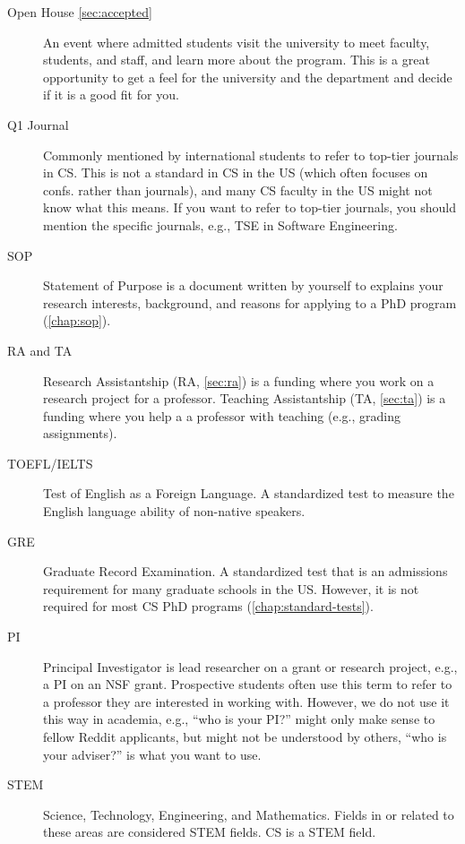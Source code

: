 \documentclass[oneside,11pt,dvipsnames]{book}
\begin{document}
\begin{description}
  \item[Open House \autoref{sec:accepted}] An event where admitted students visit the university to meet faculty, students, and staff, and learn more about the program. This is a great opportunity to get a feel for the university and the department and decide if it is a good fit for you.
  
  \item[Q1 Journal] Commonly mentioned by international students to refer to top-tier journals in CS.  This is not a standard in CS in the US (which often focuses on confs. rather than journals), and many CS faculty in the US might not know what this means.  If you want to refer to top-tier journals, you should mention the specific journals, e.g., TSE in Software Engineering.
  
  \item[SOP] Statement of Purpose is a document written by yourself to explains your research interests, background, and reasons for applying to a PhD program (\autoref{chap:sop}).

  \item[RA and TA] Research Assistantship (RA, \autoref{sec:ra}) is a funding where you work on a research project for a professor. Teaching Assistantship (TA, \autoref{sec:ta}) is a funding where you help a a professor with teaching (e.g., grading assignments).

  \item[TOEFL/IELTS] Test of English as a Foreign Language. A standardized test to measure the English language ability of non-native speakers.
  \item[GRE] Graduate Record Examination. A standardized test that is an admissions requirement for many graduate schools in the US. However, it is not required for most CS PhD programs (\autoref{chap:standard-tests}).

  \item [PI]  Principal Investigator is lead researcher on a grant or research project, e.g., a PI on an NSF grant.  Prospective students often use this term to refer to a professor they are interested in working with.  However, we do not use it this way in academia, e.g., ``who is your PI?'' might only make sense to fellow Reddit applicants, but might not be understood by others, ``who is your adviser?'' is what you want to use.

  \item[STEM] Science, Technology, Engineering, and Mathematics. Fields in or related to these areas are considered STEM fields. CS is a STEM field.
    

\end{description}
\end{document}
